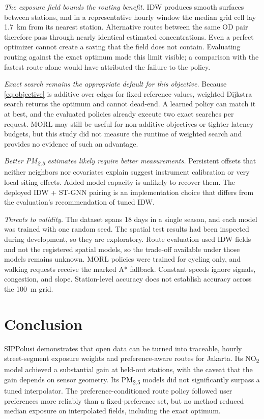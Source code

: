 \documentclass[conference]{IEEEtran}
\newcommand{\pmtf}{PM\textsubscript{2.5}}
\newcommand{\notwo}{NO\textsubscript{2}}
\begin{document}
\textit{The exposure field bounds the routing benefit.} IDW produces smooth surfaces between stations, and in a representative hourly window the median grid cell lay 1.7~km from its nearest station. Alternative routes between the same OD pair therefore pass through nearly identical estimated concentrations. Even a perfect optimizer cannot create a saving that the field does not contain. Evaluating routing against the exact optimum made this limit visible; a comparison with the fastest route alone would have attributed the failure to the policy.

\textit{Exact search remains the appropriate default for this objective.} Because \eqref{eq:objective} is additive over edges for fixed reference values, weighted Dijkstra search returns the optimum and cannot dead-end. A learned policy can match it at best, and the evaluated policies already execute two exact searches per request. MORL may still be useful for non-additive objectives or tighter latency budgets, but this study did not measure the runtime of weighted search and provides no evidence of such an advantage.

\textit{Better \pmtf{} estimates likely require better measurements.} Persistent offsets that neither neighbors nor covariates explain suggest instrument calibration or very local siting effects. Added model capacity is unlikely to recover them. The deployed IDW + ST-GNN pairing is an implementation choice that differs from the evaluation's recommendation of tuned IDW.

\textit{Threats to validity.} The dataset spans 18 days in a single season, and each model was trained with one random seed. The spatial test results had been inspected during development, so they are exploratory. Route evaluation used IDW fields and not the registered spatial models, so the trade-off available under those models remains unknown. MORL policies were trained for cycling only, and walking requests receive the marked A* fallback. Constant speeds ignore signals, congestion, and slope. Station-level accuracy does not establish accuracy across the 100~m grid.

\section{Conclusion}

SIPPolusi demonstrates that open data can be turned into traceable, hourly street-segment exposure weights and preference-aware routes for Jakarta. Its \notwo{} model achieved a substantial gain at held-out stations, with the caveat that the gain depends on sensor geometry. Its \pmtf{} models did not significantly surpass a tuned interpolator. The preference-conditioned route policy followed user preferences more reliably than a fixed-preference set, but no method reduced median exposure on interpolated fields, including the exact optimum.
\end{document}
